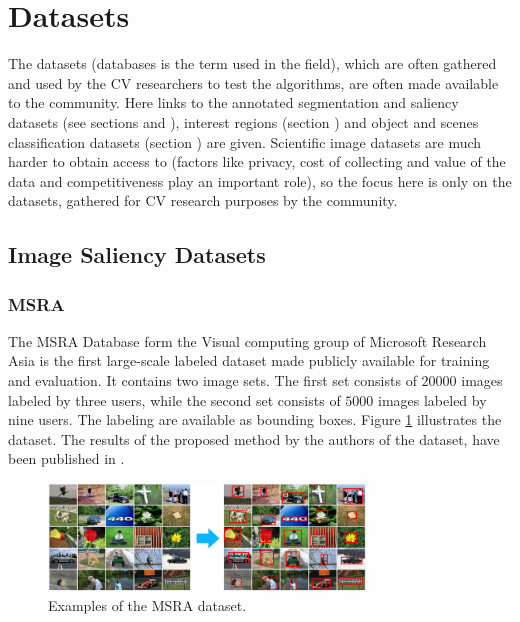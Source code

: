\section{Datasets}
\label{sec:db}

The datasets (databases is the term used in the field), which are often gathered and used by the CV researchers to test the algorithms, are often made available to the community. Here links to the annotated segmentation and saliency datasets (see sections \underline{} and  \underline{}), interest regions (section \underline{}) and object and scenes classification datasets (section \underline{}) are given. Scientific image datasets are much harder to obtain access to (factors like privacy, cost of collecting and value of the data and competitiveness play an important role), so the focus here is only on the datasets, gathered for CV research purposes by the community.

\subsection{Image Saliency Datasets}\label{db:subsec:sal}
\subsubsection{MSRA}\label{subsec:msra}
The MSRA  Database form the Visual computing group of Microsoft Research Asia \cite{msra_db} is  the first large-scale labeled dataset made publicly available for training and evaluation. It contains two image sets. The first set consists of $20 000$ images labeled by three users, while the second set consists of $5000$ images labeled by nine users. The labeling are available as bounding boxes. Figure \ref{fig:msra} illustrates the dataset. The results of the proposed method by the authors of the dataset, have been published in \cite{LiuCVPR2007}.
\begin{figure}[h]
\begin{center}
\includegraphics[width=0.75\textwidth]{fig/MSRA}
\end{center}
\caption{Examples of the MSRA dataset.}
\label{fig:msra}
\end{figure}


